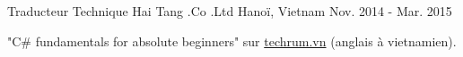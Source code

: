 

\begin{cventries}

  \cventry
    {Traducteur Technique} %
    {Hai Tang .Co .Ltd} %
    {Hanoï, Vietnam} %
    {Nov. 2014 - Mar. 2015} %
    {
      \begin{cvitems} %
        \item {"C\# fundamentals for absolute beginners" sur \href{https://techrum.vn}{techrum.vn}  (anglais à vietnamien).}
      \end{cvitems}
    }

\end{cventries}
